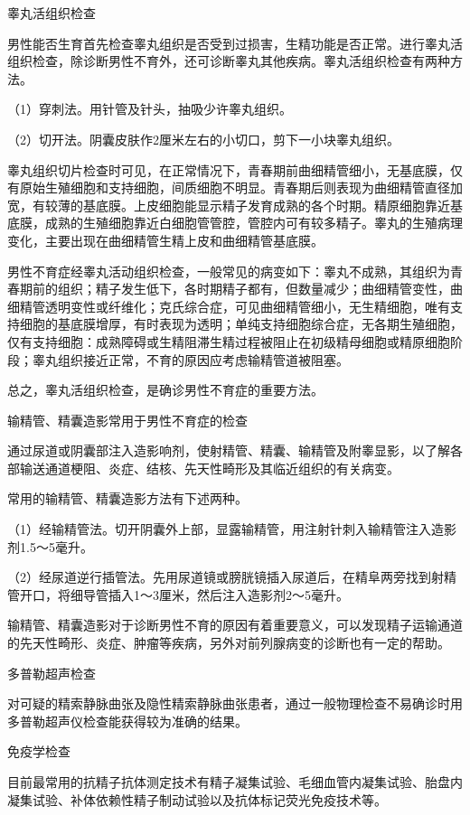 \documentclass[12pt,UTF8,openany]{ctexbook}
\begin{document}
睾丸活组织检查

男性能否生育首先检查睾丸组织是否受到过损害，生精功能是否正常。进行睾丸活组织检查，除诊断男性不育外，还可诊断睾丸其他疾病。睾丸活组织检查有两种方法。

（1）穿刺法。用针管及针头，抽吸少许睾丸组织。

（2）切开法。阴囊皮肤作2厘米左右的小切口，剪下一小块睾丸组织。

睾丸组织切片检查时可见，在正常情况下，青春期前曲细精管细小，无基底膜，仅有原始生殖细胞和支持细胞，间质细胞不明显。青春期后则表现为曲细精管直径加宽，有较薄的基底膜。上皮细胞能显示精子发育成熟的各个时期。精原细胞靠近基底膜，成熟的生殖细胞靠近白细胞管管腔，管腔内可有较多精子。睾丸的生殖病理变化，主要出现在曲细精管生精上皮和曲细精管基底膜。

男性不育症经睾丸活动组织检查，一般常见的病变如下：睾丸不成熟，其组织为青春期前的组织；精子发生低下，各时期精子都有，但数量减少；曲细精管变性，曲细精管透明变性或纤维化；克氏综合症，可见曲细精管细小，无生精细胞，唯有支持细胞的基底膜增厚，有时表现为透明；单纯支持细胞综合症，无各期生殖细胞，仅有支持细胞：成熟障碍或生精阻滞生精过程被阻止在初级精母细胞或精原细胞阶段；睾丸组织接近正常，不育的原因应考虑输精管道被阻塞。

总之，睾丸活组织检查，是确诊男性不育症的重要方法。

输精管、精囊造影常用于男性不育症的检查

通过尿道或阴囊部注入造影响剂，使射精管、精囊、输精管及附睾显影，以了解各部输送通道梗阻、炎症、结核、先天性畸形及其临近组织的有关病变。

常用的输精管、精囊造影方法有下述两种。

（1）经输精管法。切开阴囊外上部，显露输精管，用注射针刺入输精管注入造影剂1.5～5毫升。

（2）经尿道逆行插管法。先用尿道镜或膀胱镜插入尿道后，在精阜两旁找到射精管开口，将细导管插入1～3厘米，然后注入造影剂2～5毫升。

输精管、精囊造影对于诊断男性不育的原因有着重要意义，可以发现精子运输通道的先天性畸形、炎症、肿瘤等疾病，另外对前列腺病变的诊断也有一定的帮助。

多普勒超声检查

对可疑的精索静脉曲张及隐性精索静脉曲张患者，通过一般物理检查不易确诊时用多普勒超声仪检查能获得较为准确的结果。

免疫学检查

目前最常用的抗精子抗体测定技术有精子凝集试验、毛细血管内凝集试验、胎盘内凝集试验、补体依赖性精子制动试验以及抗体标记荧光免疫技术等。
\end{document}
